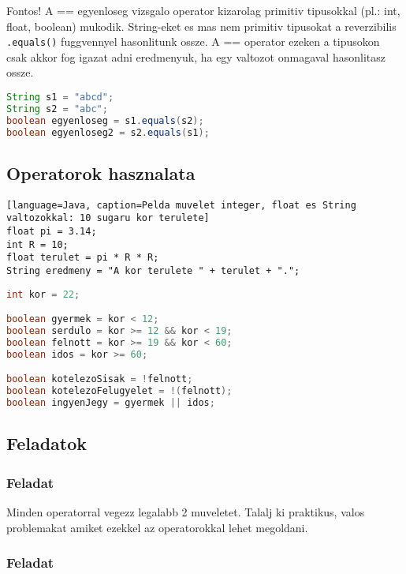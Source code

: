 \documentclass{article}
\begin{document}
Fontos!
A == egyenloseg vizsgalo operator kizarolag primitiv tipusokkal (pl.: int, float, boolean) mukodik. String-eket es mas nem primitiv tipusokat a reverzibilis \lstinline{.equals()} fuggvennyel hasonlitunk ossze. A == operator ezeken a tipusokon csak akkor fog igazat adni eredmenyuk, ha egy valtozot onmagaval hasonlitasz ossze.

\begin{lstlisting}[language=Java, caption=String egyenloseg vizsgalata helyesen]
String s1 = "abcd";
String s2 = "abc";
boolean egyenloseg = s1.equals(s2);
boolean egyenloseg2 = s2.equals(s1);
\end{lstlisting}

\newpage

\subsection{Operatorok hasznalata}

\begin{lstlisting}[language=Java, caption=Pelda muvelet integer, float es String valtozokkal: 10 sugaru kor terulete]
float pi = 3.14;
int R = 10;
float terulet = pi * R * R;
String eredmeny = "A kor terulete " + terulet + ".";
\end{lstlisting}

\begin{lstlisting}[language=Java, caption=Pelda muvelet boolean valtozokkal (kalandpark)]
int kor = 22;

boolean gyermek = kor < 12;
boolean serdulo = kor >= 12 && kor < 19;
boolean felnott = kor >= 19 && kor < 60;
boolean idos = kor >= 60;

boolean kotelezoSisak = !felnott;
boolean kotelezoFelugyelet = !(felnott);
boolean ingyenJegy = gyermek || idos;

\end{lstlisting}

\subsection{Feladatok}

\subsubsection{Feladat}

Minden operatorral vegezz legalabb 2 muveletet. Talalj ki praktikus, valos problemakat amiket ezekkel az operatorokkal lehet megoldani.

\subsubsection{Feladat}
\end{document}
